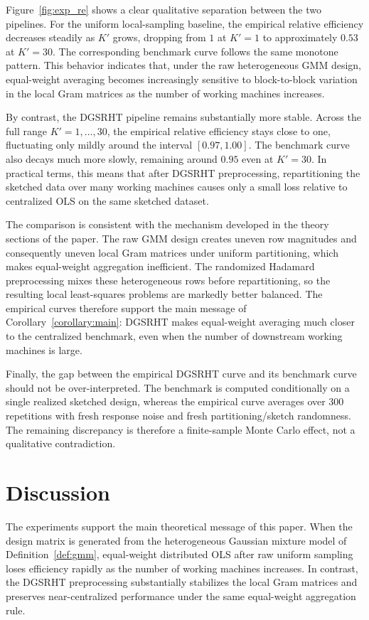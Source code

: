\documentclass[11pt,a4paper]{article}
\begin{document}
Figure~\ref{fig:exp_re} shows a clear qualitative separation between the two pipelines. For the uniform local-sampling baseline, the empirical relative efficiency decreases steadily as $K'$ grows, dropping from $1$ at $K'=1$ to approximately $0.53$ at $K'=30$. The corresponding benchmark curve follows the same monotone pattern. This behavior indicates that, under the raw heterogeneous GMM design, equal-weight averaging becomes increasingly sensitive to block-to-block variation in the local Gram matrices as the number of working machines increases.

By contrast, the DGSRHT pipeline remains substantially more stable. Across the full range $K'=1,\ldots,30$, the empirical relative efficiency stays close to one, fluctuating only mildly around the interval $[0.97,1.00]$. The benchmark curve also decays much more slowly, remaining around $0.95$ even at $K'=30$. In practical terms, this means that after DGSRHT preprocessing, repartitioning the sketched data over many working machines causes only a small loss relative to centralized OLS on the same sketched dataset.

The comparison is consistent with the mechanism developed in the theory sections of the paper. The raw GMM design creates uneven row magnitudes and consequently uneven local Gram matrices under uniform partitioning, which makes equal-weight aggregation inefficient. The randomized Hadamard preprocessing mixes these heterogeneous rows before repartitioning, so the resulting local least-squares problems are markedly better balanced. The empirical curves therefore support the main message of Corollary~\ref{corollary:main}: DGSRHT makes equal-weight averaging much closer to the centralized benchmark, even when the number of downstream working machines is large.

Finally, the gap between the empirical DGSRHT curve and its benchmark curve should not be over-interpreted. The benchmark is computed conditionally on a single realized sketched design, whereas the empirical curve averages over 300 repetitions with fresh response noise and fresh partitioning/sketch randomness. The remaining discrepancy is therefore a finite-sample Monte Carlo effect, not a qualitative contradiction.

\section{Discussion}
The experiments support the main theoretical message of this paper. When the design matrix is generated from the heterogeneous Gaussian mixture model of Definition~\ref{def:gmm}, equal-weight distributed OLS after raw uniform sampling loses efficiency rapidly as the number of working machines increases. In contrast, the DGSRHT preprocessing substantially stabilizes the local Gram matrices and preserves near-centralized performance under the same equal-weight aggregation rule.
\end{document}
